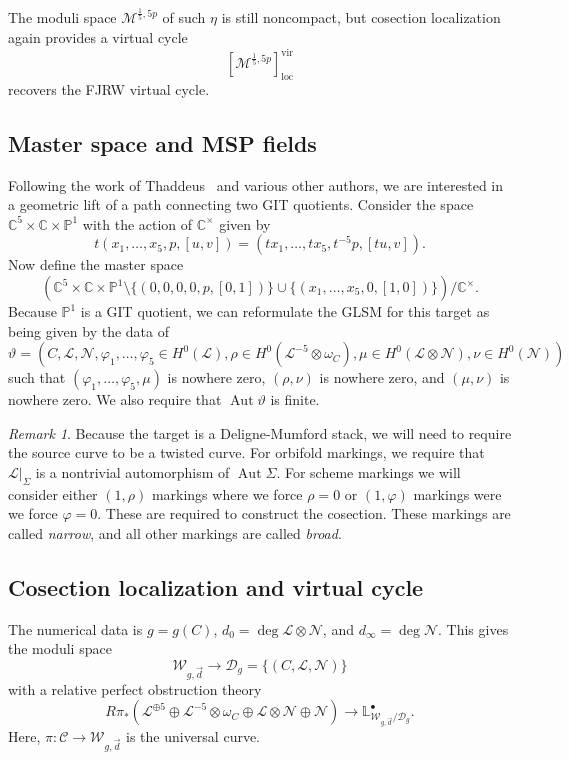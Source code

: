 \documentclass[10pt,oldfontcommands,oneside]{memoir}
\theoremstyle{definition}
\theoremstyle{remark}
\newtheorem{rmk}[thm]{Remark}
\theoremstyle{plain}
\theoremstyle{definition}
\theoremstyle{remark}
\newcommand{\C}{\mathbb{C}}
\renewcommand{\L}{\mathbb{L}}
\renewcommand{\P}{\mathbb{P}}
\newcommand{\M}{\mathcal{M}}
\newcommand{\mc}[1]{\mathcal{#1}}
\newcommand{\mr}[1]{\mathrm{#1}}
\newcommand{\on}[1]{\operatorname{#1}}
\newcommand{\1}{\mathbf{1}}
\newcommand{\2}{\mathbf{2}}
\newcommand{\3}{\mathbf{3}}
\newcommand{\vir}{\mr{vir}}
\DeclareMathOperator{\Aut}{Aut}
\begin{document}
The moduli space $\M^{\frac{1}{5},5p}$ of such $\eta$ is still noncompact, but cosection localization again provides a virtual cycle
\[ [\M^{\frac{1}{5},5p}]^{\vir}_{\on{loc}} \]
recovers the FJRW virtual cycle.

\subsection{Master space and MSP fields}%
\label{sub:Master space}

Following the work of Thaddeus~\cite{gitflips} and various other authors, we are interested in a geometric lift of a path connecting two GIT quotients. Consider the space $\C^5 \times \C \times \P^1$ with the action of $\C^{\times}$ given by
\[ t(x_1, \ldots, x_5, p, [u,v]) = (t x_1, \ldots, t x_5, t^{-5}p, [tu,v]). \]
Now define the master space
\[ (\C^5 \times \C \times \P^1 \setminus \{(0,0,0,0,p,[0,1])\} \cup \{(x_1,\ldots,x_5,0,[1,0])\}) / \C^{\times}. \]
Because $\P^1$ is a GIT quotient, we can reformulate the GLSM for this target as being given by the data of
\[\vartheta =  (C, \mc{L}, \mc{N}, \varphi_1, \ldots, \varphi_5 \in H^0(\mc{L}), \rho \in H^0(\mc{L}^{-5} \otimes \omega_C), \mu \in H^0(\mc{L} \otimes \mc{N}), \nu \in H^0(\mc{N})) \]
such that $(\varphi_1, \ldots, \varphi_5, \mu)$ is nowhere zero, $(\rho, \nu)$ is nowhere zero, and $(\mu, \nu)$ is nowhere zero. We also require that $\Aut \vartheta$ is finite.

\begin{rmk}
    Because the target is a Deligne-Mumford stack, we will need to require the source curve to be a twisted curve. For orbifold markings, we require that $\mc{L}|_{\Sigma}$ is a nontrivial automorphism of $\Aut \Sigma$. For scheme markings we will consider either $(1,\rho)$ markings where we force $\rho = 0$ or $(1,\varphi)$ markings were we force $\varphi = 0$. These are required to construct the cosection. These markings are called \textit{narrow}, and all other markings are called \textit{broad}.
\end{rmk}

\subsection{Cosection localization and virtual cycle}%
\label{sub:Cosection localization and virtual cycle}

The numerical data is $g = g(C)$, $d_0 = \deg \mc{L} \otimes \mc{N}$, and $d_{\infty} = \deg \mc{N}$. This gives the moduli space
\[ \mc{W}_{g,\vec{d}} \to \mc{D}_g = \{(C, \mc{L}, \mc{N})\} \]
with a relative perfect obstruction theory
\[ R \pi_* (\mc{L}^{\oplus 5} \oplus \mc{L}^{-5}\otimes \omega_C \oplus \mc{L} \otimes \mc{N} \oplus \mc{N}) \to \L^{\bullet}_{\mc{W}_{g,\vec{d}}/\mc{D}_g}. \]
Here, $\pi \colon \mc{C} \to \mc{W}_{g,\vec{d}}$ is the universal curve.
\end{document}
